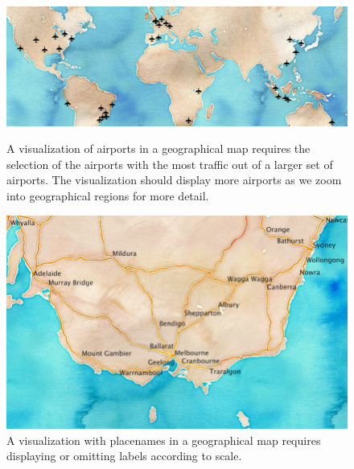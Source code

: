 \documentclass[11pt, oneside]{report}
\begin{document}
{\begin{figure}[!t]
\begin{minipage}{0.36\linewidth}
    \end{minipage} \hfill
\end{figure}
\begin{figure}[!t]
     \begin{minipage}{0.62\linewidth}
        \centerline{\includegraphics[width=0.99\linewidth]{figs-glossy/airports.png}}
        \vspace{-1ex}
        \caption{A visualization of airports in a geographical map requires the selection of the airports with the most traffic out of a larger set of airports. The visualization should display more airports as we zoom into geographical regions for more detail.}\label{fig:example:airports}
    \end{minipage} \hfill
       \begin{minipage}{0.36\linewidth}
        \centerline{\includegraphics[width=0.96\linewidth]{figs-glossy/placenames_viz.png}}
        \vspace{-1ex}
        \caption{A visualization with placenames in a geographical map requires displaying or omitting labels according to scale.} \label{fig:example:placenames}
    \end{minipage} \hfill
\end{figure}
 
}
\end{document}
